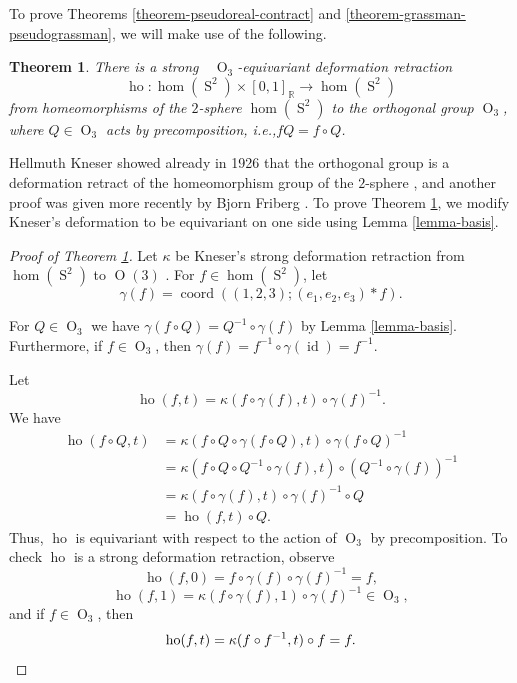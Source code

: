 \documentclass[11pt]{article}
\newcommand{\ie}{i.e.,\xspace}
\numberwithin{equation}{section}
\newtheorem{theorem}{Theorem}[subsection]
\theoremstyle{remark}
\let\mb\mathbb
\DeclareMathOperator{\orth}{O}
\DeclareMathOperator{\sphere}{S}
\DeclareMathOperator{\coord}{coord}
\DeclareMathOperator{\ho}{ho}
\DeclareMathOperator{\id}{id}
\begin{document}
To prove Theorems \ref{theorem-pseudoreal-contract} and \ref{theorem-grassman-pseudograssman}, we will make use of the following.

\begin{theorem}\label{theorem-kneser-equivariant}
There is a strong\ ~$\orth_3$-equivariant deformation retraction
\[\ho : \hom(\sphere^2) \times [0,1]_\mb{R} \to \hom(\sphere^2)\]
from homeomorphisms of the $2$-sphere $\hom(\sphere^2)$ to the orthogonal group $\orth_3$,
where $Q \in \orth_3$ acts by precomposition, \ie $fQ = f \circ Q$.
\end{theorem}

Hellmuth Kneser showed already in 1926 that the orthogonal group is a deformation retract of the homeomorphism group of the $2$-sphere \cite{kneser1926deformationssatze}, and another proof was given more recently by Bjorn Friberg \cite{friberg1973topological}.
To prove Theorem \ref{theorem-kneser-equivariant}, we modify Kneser's deformation to be equivariant on one side using Lemma \ref{lemma-basis}.

\begin{proof}[Proof of Theorem \ref{theorem-kneser-equivariant}]
Let $\kappa$ be Kneser's strong deformation retraction from $\hom(\sphere^2)$ to $\orth(3)$ \cite{kneser1926deformationssatze}.
For $f \in \hom(\sphere^2)$, let
\[ \gamma(f) = \coord((1,2,3);(e_1,e_2,e_3)*f). \]

For $Q \in \orth_3$ we have $\gamma(f\circ Q) = Q^{-1} \circ \gamma(f)$ by Lemma \ref{lemma-basis}. Furthermore, if $f \in \orth_3$, then $\gamma(f) = f^{-1} \circ \gamma(\id) = f^{-1}$.

Let
\[ \ho(f,t) = \kappa(f \circ \gamma(f),t) \circ \gamma(f)^{-1}. \]
We have
\begin{align*}
\ho(f \circ Q,t)
&= \kappa(f \circ Q \circ \gamma(f \circ Q),t) \circ \gamma(f \circ Q)^{-1} \\
&= \kappa(f \circ Q \circ Q^{-1} \circ \gamma(f),t) \circ (Q^{-1} \circ \gamma(f))^{-1} \\
&= \kappa(f \circ \gamma(f),t) \circ \gamma(f)^{-1} \circ Q \\
&= \ho(f ,t) \circ Q.
\end{align*}
Thus, $\ho$ is equivariant with respect to the action of $\orth_3$ by precomposition.
To check $\ho$ is a strong deformation retraction, observe
\[\ho(f,0) = f \circ \gamma(f) \circ \gamma(f)^{-1} = f, \]
\[\ho(f,1) = \kappa(f \circ \gamma(f),1) \circ \gamma(f)^{-1} \in \orth_3, \]
and if $f \in \orth_3$, then
\[\ho(f,t) = \kappa(f \circ f^{-1},t) \circ f = f. \qedhere \]
\end{proof}
\end{document}

